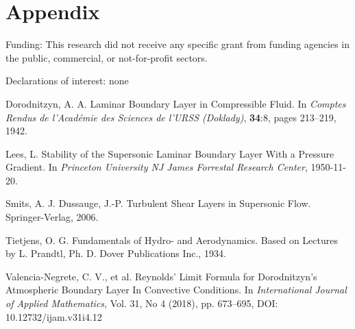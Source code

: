 \documentclass{article}
\begin{document}




\section{Appendix}
\label{sec:sample:appendix}

Funding: This research did not receive any specific grant from funding agencies in the public, commercial, or not-for-profit sectors.

Declarations of interest: none


  


\begin{thebibliography}{1}

Dorodnitzyn, A. A.
\newblock Laminar Boundary Layer in Compressible Fluid.
\newblock In {\em Comptes Rendus de l'Acad\'{e}mie des Sciences de l'URSS (Doklady)},
\textbf{34}:8,
pages 213--219, 1942.

 Lees, L.
\newblock Stability of the Supersonic Laminar Boundary Layer With a Pressure Gradient.
\newblock In {\em Princeton University NJ James Forrestal Research Center}, 
1950-11-20.

Smits, A. J. Dussauge, J.-P.
\newblock Turbulent Shear Layers in Supersonic Flow.
Springer-Verlag, 2006.

Tietjens, O. G.
\newblock Fundamentals of Hydro- and Aerodynamics. Based on Lectures by L. Prandtl, Ph. D.
Dover Publications Inc., 1934.

Valencia-Negrete, C. V., et al.
\newblock Reynolds' Limit Formula for Dorodnitzyn's Atmospheric Boundary Layer
In Convective Conditions.
\newblock In {\em International Journal of Applied Mathematics}, 
Vol. 31, No 4 (2018), pp. 673--695, DOI: 10.12732/ijam.v31i4.12

\end{thebibliography}
\end{document}
